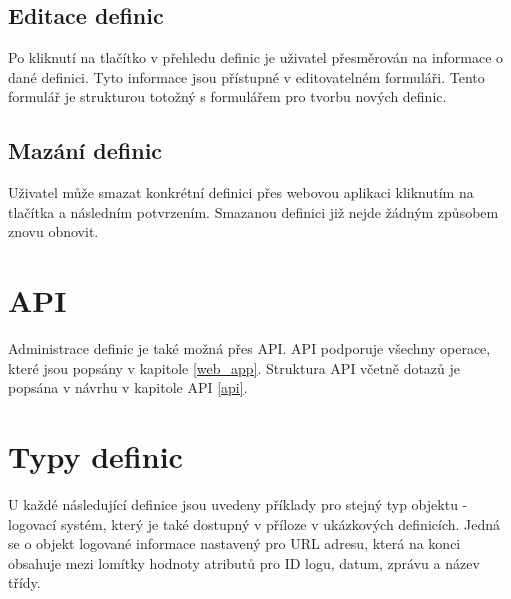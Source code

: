 \documentclass[thesis=B,czech]{FITthesis}[2012/06/26]
\begin{document}
    \subsection{Editace definic}
    Po kliknutí na tlačítko  v přehledu definic je uživatel přesměrován na informace o dané definici.
    Tyto informace jsou přístupné v editovatelném formuláři. Tento formulář je strukturou totožný s 
    formulářem pro tvorbu nových definic.
    
    \subsection{Mazání definic}
    Uživatel může smazat konkrétní definici přes webovou aplikaci kliknutím na tlačítka  a následním potvrzením.
    Smazanou definici již nejde žádným způsobem znovu obnovit.    
    
    \section{API}
    Administrace definic je také možná přes API. API podporuje všechny operace, které jsou popsány v kapitole \ref{web_app}. Struktura API včetně dotazů je
    popsána v návrhu v kapitole API \ref{api}.
    
    \section{Typy definic}\label{def_types}
    U každé následující definice jsou uvedeny příklady pro stejný typ objektu - logovací systém, který je také
    dostupný v příloze v ukázkových definicích. Jedná se o objekt logované informace nastavený pro URL adresu, která na konci obsahuje mezi lomítky
    hodnoty atributů pro ID logu, datum, zprávu a název třídy. 
    
\end{document}
